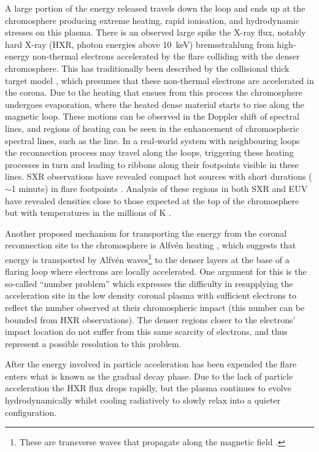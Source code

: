 A large portion of the energy released travels down the loop and ends up at the chromosphere producing extreme heating, rapid ionisation, and hydrodynamic stresses on this plasma.
There is an observed large spike the X-ray flux, notably hard X-ray (HXR, photon energies above \SI{10}{\kilo\electronvolt}) bremsstrahlung from high-energy non-thermal electrons accelerated by the flare colliding with the denser chromosphere.
This has traditionally been described by the collisional thick target model \citep{Brown1971,Hudson1972}, which presumes that these non-thermal electrons are accelerated in the corona.
Due to the heating that ensues from this process the chromosphere undergoes evaporation, where the heated dense material starts to rise along the magnetic loop.
These motions can be observed in the Doppler shift of spectral lines, and regions of heating can be seen in the enhancement of chromospheric spectral lines, such as the \Ha{} line.
In a real-world system with neighbouring loops the reconnection process may travel along the loops, triggering these heating processes in turn and leading to ribbons along their footpoints visible in these lines.
SXR observations have revealed compact hot sources with short durations ($\sim$1 minute) in flare footpoints \citep{Hudson1994}.
Analysis of these regions in both SXR and EUV have revealed densities close to those expected at the top of the chromosphere but with temperatures in the millions of \si{\kelvin} \citep{Mrozek2004,Graham2013,Simoes2015}.

Another proposed mechanism for transporting the energy from the coronal reconnection site to the chromosphere is Alfvén heating \citep{Emslie1982, Fletcher2007}, which suggests that energy is transported by Alfvén waves\footnote{These  are transverse waves that propagate along the magnetic field \citep[e.g. ][]{TandbergHanssen1988}.} to the denser layers at the base of a flaring loop where electrons are locally accelerated.
One argument for this is the so-called ``number problem'' which expresses the difficulty in resupplying the acceleration site in the low density coronal plasma with sufficient electrons to reflect the number observed at their chromospheric impact (this number can be bounded from HXR observations).
The denser regions closer to the electrons' impact location do not suffer from this same scarcity of electrons, and thus represent a possible resolution to this problem.

After the energy involved in particle acceleration has been expended the flare enters what is known as the gradual decay phase.
Due to the lack of particle acceleration the HXR flux drops rapidly, but the plasma continues to evolve hydrodynamically whilst cooling radiatively to slowly relax into a quieter configuration.

